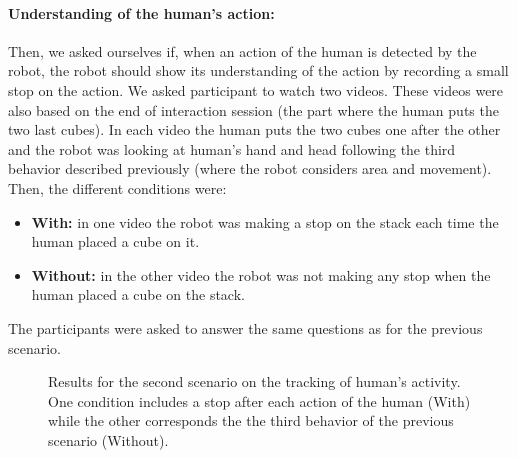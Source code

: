 \documentclass[english,a4paper,11pt,twoside]{StyleThese}
\begin{document}
\paragraph{Understanding of the human's action:} Then, we asked ourselves if, when an action of the human is detected by the robot, the robot should show its understanding of the action by recording a small stop on the action. We asked participant to watch two videos. These videos were also based on the end of interaction session (the part where the human puts the two last cubes). In each video the human puts the two cubes one after the other and the robot was looking at human's hand and head following the third behavior described previously (where the robot considers area and movement). Then, the different conditions were:
\begin{itemize}
\item \textbf{With:} in one video the robot was making a stop on the stack each time the human placed a cube on it.
\item \textbf{Without:} in the other video the robot was not making any stop when the human placed a cube on the stack.
\end{itemize} 
The participants were asked to answer the same questions as for the previous scenario.

\begin{figure}[!h]
\centering
	\hfill
    \caption{Results for the second scenario on the tracking of human's activity. One condition includes a stop after each action of the human (With) while the other corresponds the the third behavior of the previous scenario (Without).}
    \label{fig:resSce3}
\end{figure}
\end{document}

